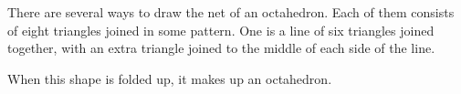 There are several ways to draw the net of an octahedron. Each of them consists
of eight triangles joined in some pattern. One is a line of six triangles joined
together, with an extra triangle joined to the middle of each side of the line.
\par
When this shape is folded up, it makes up an octahedron.